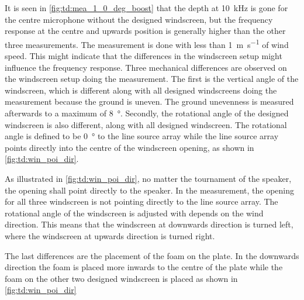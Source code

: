 
It is seen in \autoref{fig:td:mea_1_0_deg_boost} that the depth at \SI{10}{\kilo\hertz} is gone for the centre microphone without the designed windscreen, but the frequency response at the centre and upwards position is generally higher than the other three measurements. The measurement is done with less than \SI{1}{\meter\per\second} of wind speed. This might indicate that the differences in the windscreen setup might influence the frequency response. 
Three mechanical differences are observed on the windscreen setup doing the measurement. The first is the vertical angle of the windscreen, which is different along with all designed windscreens doing the measurement because the ground is uneven. The ground unevenness is measured afterwards to a maximum of \SI{8}{\degree}. Secondly, the rotational angle of the designed windscreen is also different, along with all designed windscreen. The rotational angle is defined to be \SI{0}{\degree} to the line source array while the line source array points directly into the centre of the windscreen opening, as shown in \autoref{fig:td:win_poi_dir}.


As illustrated in \autoref{fig:td:win_poi_dir}, no matter the tournament of the speaker, the opening shall point directly to the speaker. In the measurement, the opening for all three windscreen is not pointing directly to the line source array. The rotational angle of the windscreen is adjusted with depends on the wind direction. This means that the windscreen at downwards direction is turned left, where the windscreen at upwards direction is turned right. 

The last differences are the placement of the foam on the plate. In the downwards direction the foam is placed more inwards to the centre of the plate while the foam on the other two designed windscreen is placed as shown in \autoref{fig:td:win_poi_dir}


